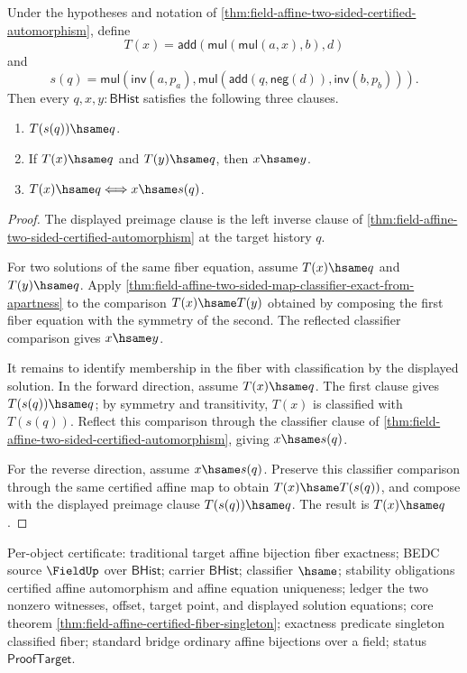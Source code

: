 \begin{theorem}
\label{thm:field-affine-explicit-fiber-classifier}
\label{thm:field-affine-certified-fiber-singleton}
Under the hypotheses and notation of
\autoref{thm:field-affine-two-sided-certified-automorphism}, define
$$
T(x)=\mathsf{add}(\mathsf{mul}(\mathsf{mul}(a,x),b),d)
$$
and
$$
s(q)=
\mathsf{mul}(\mathsf{inv}(a,p_a),
\mathsf{mul}(\mathsf{add}(q,\mathsf{neg}(d)),\mathsf{inv}(b,p_b))).
$$
Then every $q,x,y:\mathsf{BHist}$ satisfies the following three clauses.
\begin{enumerate}
\item $T(s(q))\hsame q$.
\item If $T(x)\hsame q$ and $T(y)\hsame q$, then $x\hsame y$.
\item $T(x)\hsame q\Longleftrightarrow x\hsame s(q)$.
\end{enumerate}
\end{theorem}
\begin{proof}
The displayed preimage clause is the left inverse clause of
\autoref{thm:field-affine-two-sided-certified-automorphism} at the target
history $q$.

For two solutions of the same fiber equation, assume $T(x)\hsame q$ and
$T(y)\hsame q$. Apply
\autoref{thm:field-affine-two-sided-map-classifier-exact-from-apartness} to
the comparison $T(x)\hsame T(y)$ obtained by composing the first fiber
equation with the symmetry of the second. The reflected classifier comparison
gives $x\hsame y$.

It remains to identify membership in the fiber with classification by the
displayed solution. In the forward direction, assume $T(x)\hsame q$. The first
clause gives $T(s(q))\hsame q$; by symmetry and transitivity, $T(x)$ is
classified with $T(s(q))$. Reflect this comparison through the classifier
clause of \autoref{thm:field-affine-two-sided-certified-automorphism}, giving
$x\hsame s(q)$.

For the reverse direction, assume $x\hsame s(q)$. Preserve this classifier
comparison through the same certified affine map to obtain
$T(x)\hsame T(s(q))$, and compose with the displayed preimage clause
$T(s(q))\hsame q$. The result is $T(x)\hsame q$.
\end{proof}

Per-object certificate: traditional target affine bijection fiber exactness;
BEDC source $\FieldUp$ over $\mathsf{BHist}$; carrier $\mathsf{BHist}$;
classifier $\hsame$; stability obligations certified affine automorphism and
affine equation uniqueness; ledger the two nonzero witnesses, offset, target
point, and displayed solution equations; core theorem
\autoref{thm:field-affine-certified-fiber-singleton}; exactness predicate
singleton classified fiber; standard bridge ordinary affine bijections over a
field; status $\mathsf{ProofTarget}$.

